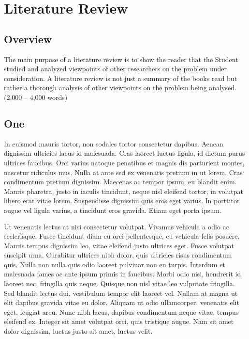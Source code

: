 
\chapter{Literature Review}
\begin{spacing}{1.5}
\setlength{\parskip}{0.3in}

\section{Overview}

The main purpose of a literature review is to show the reader that the Student studied and analyzed viewpoints of other researchers on the problem under consideration. A literature review is not just a summary of the books read but rather a thorough analysis of other viewpoints on the problem being analysed. (2,000 – 4,000 words)


\section{One}
In euismod mauris tortor, non sodales tortor consectetur dapibus. Aenean dignissim ultricies lacus id malesuada. Cras laoreet luctus ligula, id dictum purus ultrices faucibus. Orci varius natoque penatibus et magnis dis parturient montes, nascetur ridiculus mus. Nulla at ante sed ex venenatis pretium in ut lorem. Cras condimentum pretium dignissim. Maecenas ac tempor ipsum, eu blandit enim. Mauris pharetra, justo in iaculis tincidunt, neque nisl eleifend tortor, in volutpat libero erat vitae lorem. Suspendisse dignissim quis eros eget varius. In porttitor augue vel ligula varius, a tincidunt eros gravida. Etiam eget porta ipsum.

Ut venenatis lectus at nisi consectetur volutpat. Vivamus vehicula a odio ac scelerisque. Fusce tincidunt diam eu orci pellentesque, eu vehicula felis posuere. Mauris tempus dignissim leo, vitae eleifend justo ultrices eget. Fusce volutpat suscipit urna. Curabitur ultrices nibh dolor, quis ultricies risus condimentum quis. Nulla non nulla quis odio laoreet pulvinar non eu turpis. Interdum et malesuada fames ac ante ipsum primis in faucibus. Morbi odio nisi, hendrerit id laoreet nec, fringilla quis neque. Quisque non nisl vitae leo vulputate fringilla. Sed blandit lectus dui, vestibulum tempor elit laoreet vel. Nullam at magna ut elit dapibus gravida vitae eu dolor. Aliquam ut odio ullamcorper, venenatis elit eget, feugiat arcu. Nunc nibh lacus, dapibus condimentum neque vitae, tempus eleifend ex. Integer sit amet volutpat orci, quis tristique augue. Nam sit amet dolor dignissim, luctus justo sit amet, luctus velit.


\end{spacing}
